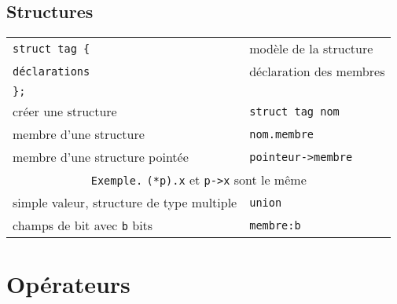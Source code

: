 \documentclass{article}
\newcommand{\key}[2]{#1 &\texttt{#2} \\ }
\newcommand{\keyg}[2]{\texttt{#2}&#1\\}
\newcommand{\exemple}[1]{\multicolumn{2}{c}{\texttt{Exemple.} #1}\\}
\newcommand{\tab}{\hspace{2em}}
\newenvironment{keylist}
     {\noindent\begin{tabular*}{\linewidth}{ll}} %
     {\end{tabular*}}
\begin{document}
\begin{multicols*}{3}
\subsection*{Structures}
\begin{keylist}
\keyg{modèle de la structure}{struct \texttt{tag} \{}
\keyg{déclaration des membres}{\tab\texttt{déclarations}}
\keyg{}{\};}
\key{créer une structure}{struct \texttt{tag} \texttt{nom}}
\key{membre d'une structure}{\texttt{nom}.\texttt{membre}}
\key{membre d'une structure pointée}{\texttt{pointeur}->\texttt{membre}}
\exemple{\texttt{(*p).x} et \texttt{p->x} sont le même}
\key{simple valeur, structure de type multiple}{union}
\key{champs de bit avec \texttt{b} bits}{\texttt{membre}:\texttt{b}}
\end{keylist}

\section*{Opérateurs}


\end{multicols*}
\end{document}
